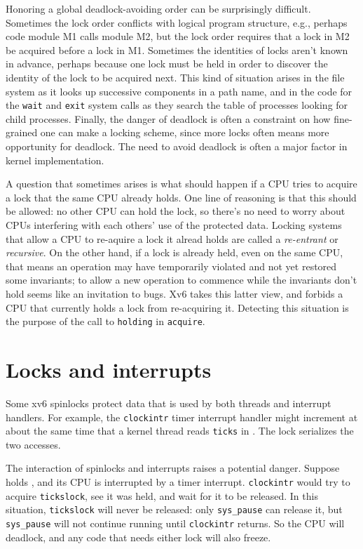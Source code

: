 Honoring a global deadlock-avoiding order can be surprisingly
difficult. Sometimes the lock order conflicts with logical program
structure, e.g., perhaps code module M1 calls module M2, but the lock
order requires that a lock in M2 be acquired before a lock in M1.
Sometimes the identities of locks aren't known in advance, perhaps
because one lock must be held in order to discover the identity
of the lock to be acquired next. This kind of situation arises in the
file system as it looks up successive components in a path name, and
in the code for the {\tt wait} and {\tt exit} system calls
as they search the table of
processes looking for child processes. Finally, the danger of deadlock
is often a constraint on how fine-grained one can make a locking
scheme, since more locks often means more opportunity for deadlock.
The need to avoid deadlock is often a major factor in kernel
implementation.

A question that sometimes arises is what should happen if a CPU tries
to acquire a lock that the same CPU already holds. One line of
reasoning is that this should be allowed: no other CPU can hold the
lock, so there's no need to worry about CPUs interfering with each
others' use of the protected data. Locking systems that allow a CPU to
re-aquire a lock it alread holds are called a {\it re-entrant} or {\it
  recursive}. On the other hand, if a lock is already held, even on
the same CPU, that means an operation may have temporarily violated
and not yet restored some invariants; to allow a new operation to
commence while the invariants don't hold seems like an invitation to
bugs. Xv6 takes this latter view, and forbids a CPU that currently
holds a lock from re-acquiring it. Detecting this situation is the
purpose of the call to {\tt holding} in {\tt acquire}.

\section{Locks and interrupts}
\label{s:lockinter}

Some xv6 spinlocks protect data that is used by
both threads and interrupt handlers.
For example, the
\lstinline{clockintr}
timer interrupt handler might increment
at about the same time that a kernel
thread reads
\lstinline{ticks} 
in
.
The lock
serializes the two accesses.

The interaction of spinlocks and interrupts raises a potential danger.
Suppose
holds
,
and its CPU is interrupted by a timer interrupt.
\lstinline{clockintr}
would try to acquire
\lstinline{tickslock},
see it was held, and wait for it to be released.
In this situation,
\lstinline{tickslock}
will never be released: only
\lstinline{sys_pause}
can release it, but
\lstinline{sys_pause}
will not continue running until
\lstinline{clockintr}
returns.
So the CPU will deadlock, and any code
that needs either lock will also freeze.


